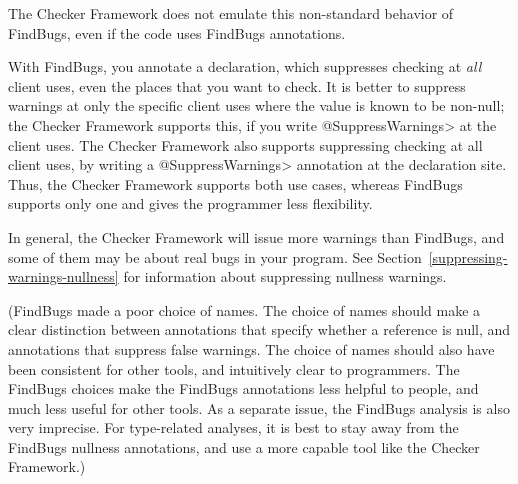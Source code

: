 \noindent
The Checker Framework does not emulate this non-standard behavior of
FindBugs, even if the code uses FindBugs annotations.

With FindBugs, you annotate a declaration, which suppresses checking at
\emph{all} client uses, even the places that you want to check.
It is better to suppress warnings at only the specific client uses
where the value is known to be non-null; the Checker Framework supports
this, if you write \<@SuppressWarnings> at the client uses.
The Checker Framework also supports suppressing checking at all client uses,
by writing a \<@SuppressWarnings> annotation at the declaration site.
Thus, the Checker Framework supports both use cases, whereas FindBugs
supports only one and gives the programmer less flexibility.

In general, the Checker Framework will issue more warnings than FindBugs,
and some of them may be about real bugs in your program.
See Section~\ref{suppressing-warnings-nullness} for information about
suppressing nullness warnings.

(FindBugs made a poor choice of names.  The choice of names should make a
clear distinction between annotations that specify whether a reference is
null, and annotations that suppress false warnings.  The choice of names
should also have been consistent for other tools, and intuitively clear to
programmers.  The FindBugs choices make the FindBugs annotations less
helpful to people, and much less useful for other tools.  As a separate
issue, the FindBugs
analysis is also very imprecise.  For type-related analyses, it is best to
stay away from the FindBugs nullness annotations, and use a more capable
tool like the Checker Framework.)



